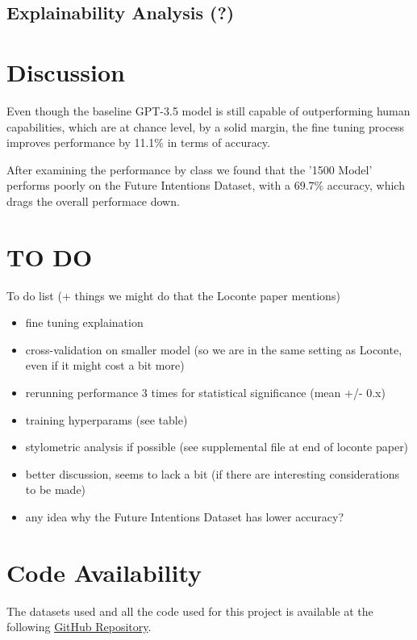 \documentclass[10pt,twocolumn,letterpaper]{article}
\begin{document}
\subsection{Explainability Analysis (?)}

\section{Discussion}

Even though the baseline GPT-3.5 model is still capable of outperforming human capabilities, which
are at chance level, by a solid margin, the fine tuning process improves performance by 11.1\% in terms
of accuracy.

After examining the performance by class we found that the '1500 Model' performs poorly on the Future
Intentions Dataset, with a 69.7\% accuracy, which drags the overall performace down.

\section{TO DO}
To do list (+ things we might do that the Loconte paper mentions)

\begin{itemize}
    \item fine tuning explaination
    \item cross-validation on smaller model (so we are in the same setting as Loconte, even if it might cost a bit more)
    \item rerunning performance 3 times for statistical significance (mean +/- 0.x)
    \item training hyperparams (see table)
    \item stylometric analysis if possible (see supplemental file at end of loconte paper)
    \item better discussion, seems to lack a bit (if there are interesting considerations to be made)
    \item any idea why the Future Intentions Dataset has lower accuracy?
\end{itemize}

\section{Code Availability}
The datasets used and all the code used for this project is available
at the following \href{https://github.com/TannerAGraves/GPT-LieDetection/}{GitHub Repository}.
\end{document}
